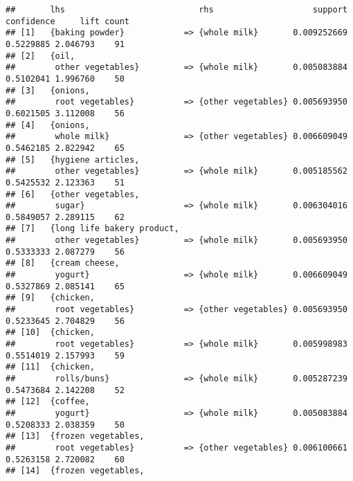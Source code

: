 \documentclass[]{article}
\begin{document}
\begin{verbatim}
##       lhs                           rhs                    support confidence     lift count
## [1]   {baking powder}            => {whole milk}       0.009252669  0.5229885 2.046793    91
## [2]   {oil,                                                                                 
##        other vegetables}         => {whole milk}       0.005083884  0.5102041 1.996760    50
## [3]   {onions,                                                                              
##        root vegetables}          => {other vegetables} 0.005693950  0.6021505 3.112008    56
## [4]   {onions,                                                                              
##        whole milk}               => {other vegetables} 0.006609049  0.5462185 2.822942    65
## [5]   {hygiene articles,                                                                    
##        other vegetables}         => {whole milk}       0.005185562  0.5425532 2.123363    51
## [6]   {other vegetables,                                                                    
##        sugar}                    => {whole milk}       0.006304016  0.5849057 2.289115    62
## [7]   {long life bakery product,                                                            
##        other vegetables}         => {whole milk}       0.005693950  0.5333333 2.087279    56
## [8]   {cream cheese,                                                                        
##        yogurt}                   => {whole milk}       0.006609049  0.5327869 2.085141    65
## [9]   {chicken,                                                                             
##        root vegetables}          => {other vegetables} 0.005693950  0.5233645 2.704829    56
## [10]  {chicken,                                                                             
##        root vegetables}          => {whole milk}       0.005998983  0.5514019 2.157993    59
## [11]  {chicken,                                                                             
##        rolls/buns}               => {whole milk}       0.005287239  0.5473684 2.142208    52
## [12]  {coffee,                                                                              
##        yogurt}                   => {whole milk}       0.005083884  0.5208333 2.038359    50
## [13]  {frozen vegetables,                                                                   
##        root vegetables}          => {other vegetables} 0.006100661  0.5263158 2.720082    60
## [14]  {frozen vegetables,                                                                   

\end{verbatim}
\end{document}
